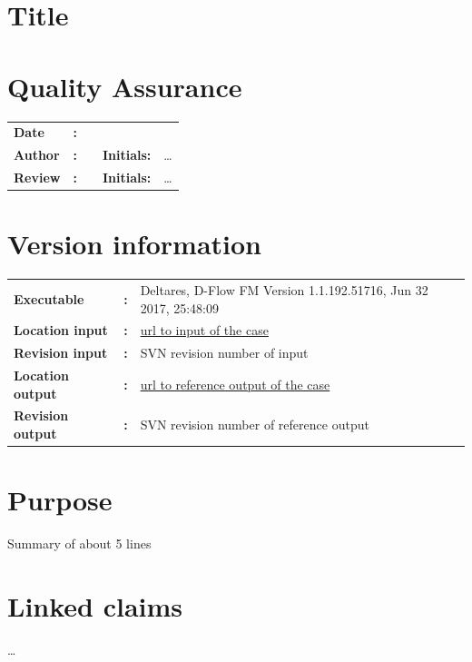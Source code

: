 

\section{Title}
\newrefsegment

\section*{Quality Assurance}
\begin{tabular}{@{}p{27mm}@{}p{0mm}p{\textwidth-52mm-48pt}p{15mm}p{10mm}}
\textbf{Date} & \textbf{:} &   \\ 
\textbf{Author} & \textbf{:} &   & \textbf{Initials:} & \ldots \\
\textbf{Review} & \textbf{:} &   & \textbf{Initials:} & \ldots 
\end{tabular}

\section*{Version information}
{{
\begin{tabular}{@{}p{27mm}@{}p{0mm}p{\textwidth-27mm-24pt}}
\textbf{Executable}   & \textbf{:} & Deltares, D-Flow FM Version 1.1.192.51716, Jun 32 2017, 25:48:09  \\
\textbf{Location input}     & \textbf{:} & \url{url to input of the case} \\
\textbf{Revision input} & \textbf{:} & SVN revision number of input \\
\textbf{Location output}     & \textbf{:} & \url{url to reference output of the case} \\
\textbf{Revision output} & \textbf{:} & SVN revision number of reference output
\end{tabular}
}}

\section*{Purpose}
Summary of about 5 lines

\section*{Linked claims}
\ldots

